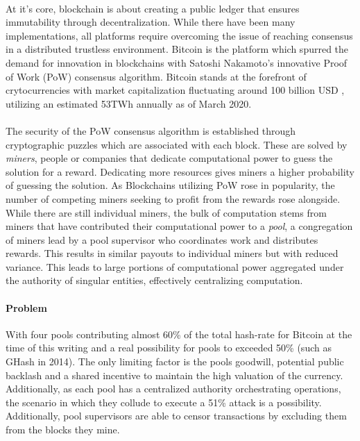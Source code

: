 \paragraph{} At it's core, blockchain is about creating a public ledger that ensures immutability through decentralization. While there have been many implementations, all platforms require overcoming the issue of reaching consensus in a distributed trustless environment. Bitcoin \cite{nakamoto2009} is the platform which spurred the demand for innovation in blockchains with Satoshi Nakamoto's innovative Proof of Work (PoW) consensus algorithm. Bitcoin stands at the forefront of crytocurrencies with market capitalization fluctuating around 100 billion USD \cite{bitcoinmarketcap2020}, utilizing an estimated 53TWh annually \cite{cambridge2020} as of March 2020.


\paragraph{} The security of the PoW consensus algorithm is established through cryptographic puzzles which are associated with each block. These are solved by \textit{miners}, people or companies that dedicate computational power to guess the solution for a reward. Dedicating more resources gives miners a higher probability of guessing the solution. As Blockchains utilizing PoW rose in popularity, the number of competing miners seeking to profit from the rewards rose alongside. While there are still individual miners, the bulk of computation stems from miners that have contributed their computational power to a \textit{pool}, a congregation of miners lead by a pool supervisor who coordinates work and distributes rewards. This results in similar payouts to individual miners but with reduced variance. This leads to large portions of computational power aggregated under the authority of singular entities, effectively centralizing computation.

\paragraph{Problem} With four pools contributing almost 60\% of the total hash-rate for Bitcoin \cite{bitcoinpools2020} at the time of this writing and a real possibility for pools to exceeded 50\% (such as GHash in 2014). The only limiting factor is the pools goodwill, potential public backlash and a shared incentive to maintain the high valuation of the currency. Additionally, as each pool has a centralized authority orchestrating operations, the scenario in which they collude to execute a 51\% attack is a possibility. Additionally, pool supervisors are able to censor transactions by excluding them from the blocks they mine. 

